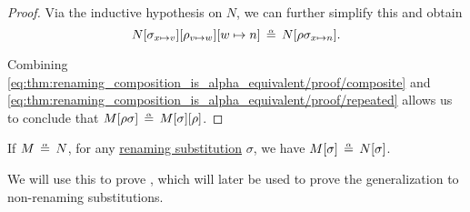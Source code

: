 \begin{proof}
  Via the inductive hypothesis on \( N \), we can further simplify this and obtain
  \begin{equation}\label{eq:thm:renaming_composition_is_alpha_equivalent/proof/repeated}
    N[\sigma_{x \mapsto v}][\rho_{v \mapsto w}][w \mapsto n] \aequiv N[\rho\sigma_{x \mapsto n}].
  \end{equation}

  Combining \eqref{eq:thm:renaming_composition_is_alpha_equivalent/proof/composite} and \eqref{eq:thm:renaming_composition_is_alpha_equivalent/proof/repeated} allows us to conclude that \( M[\rho\sigma] \aequiv M[\sigma][\rho] \).
\end{proof}

\begin{lemma}\label{thm:renaming_on_alpha_equivalent_terms}
  If \( M \aequiv N \), for any \hyperref[def:lambda_renaming]{renaming substitution} \( \sigma \), we have \( M[\sigma] \aequiv N[\sigma] \).
\end{lemma}
\begin{comments}
  \item We will use this to prove , which will later be used to prove the generalization  to non-renaming substitutions.
\end{comments}

